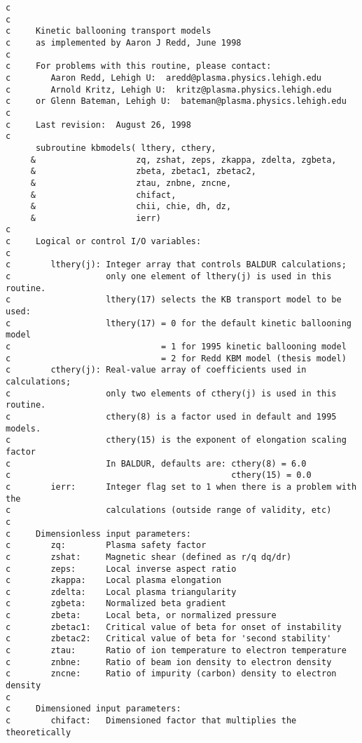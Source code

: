 \begin{verbatim}
c
c
c     Kinetic ballooning transport models
c     as implemented by Aaron J Redd, June 1998
c
c     For problems with this routine, please contact:
c        Aaron Redd, Lehigh U:  aredd@plasma.physics.lehigh.edu
c        Arnold Kritz, Lehigh U:  kritz@plasma.physics.lehigh.edu
c     or Glenn Bateman, Lehigh U:  bateman@plasma.physics.lehigh.edu
c
c     Last revision:  August 26, 1998
c
      subroutine kbmodels( lthery, cthery,
     &                    zq, zshat, zeps, zkappa, zdelta, zgbeta,
     &                    zbeta, zbetac1, zbetac2,
     &                    ztau, znbne, zncne,
     &                    chifact,
     &                    chii, chie, dh, dz,
     &                    ierr)
c
c     Logical or control I/O variables:
c
c        lthery(j): Integer array that controls BALDUR calculations;
c                   only one element of lthery(j) is used in this routine.
c                   lthery(17) selects the KB transport model to be used:
c                   lthery(17) = 0 for the default kinetic ballooning model
c                              = 1 for 1995 kinetic ballooning model
c                              = 2 for Redd KBM model (thesis model)
c        cthery(j): Real-value array of coefficients used in calculations;
c                   only two elements of cthery(j) is used in this routine.
c                   cthery(8) is a factor used in default and 1995 models.
c                   cthery(15) is the exponent of elongation scaling factor
c                   In BALDUR, defaults are: cthery(8) = 6.0
c                                            cthery(15) = 0.0
c        ierr:      Integer flag set to 1 when there is a problem with the
c                   calculations (outside range of validity, etc)
c
c     Dimensionless input parameters:
c        zq:        Plasma safety factor
c        zshat:     Magnetic shear (defined as r/q dq/dr)
c        zeps:      Local inverse aspect ratio
c        zkappa:    Local plasma elongation
c        zdelta:    Local plasma triangularity
c        zgbeta:    Normalized beta gradient
c        zbeta:     Local beta, or normalized pressure
c        zbetac1:   Critical value of beta for onset of instability
c        zbetac2:   Critical value of beta for 'second stability'
c        ztau:      Ratio of ion temperature to electron temperature
c        znbne:     Ratio of beam ion density to electron density
c        zncne:     Ratio of impurity (carbon) density to electron density
c
c     Dimensioned input parameters:
c        chifact:   Dimensioned factor that multiplies the theoretically

\end{verbatim}
